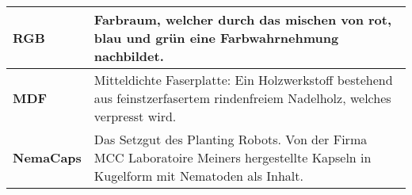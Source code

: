 \begin{table}[H]
\begin{tabular}{|L{4.5cm}|L{11cm}|}
		\hline
		\textbf{RGB} &  Farbraum, welcher durch das mischen von rot, blau und grün eine Farbwahrnehmung nachbildet. \\
		
		\hline
		\textbf{MDF} &  Mitteldichte Faserplatte: Ein Holzwerkstoff bestehend aus feinstzerfasertem rindenfreiem Nadelholz, welches verpresst wird.  \\		
		
		\hline
		\textbf{NemaCaps} &  Das Setzgut des Planting Robots. Von der Firma MCC Laboratoire Meiners hergestellte Kapseln in Kugelform mit Nematoden als Inhalt. \\
		
		\hline
	\end{tabular} 
	\vspace{0.2cm}
\end{table}


